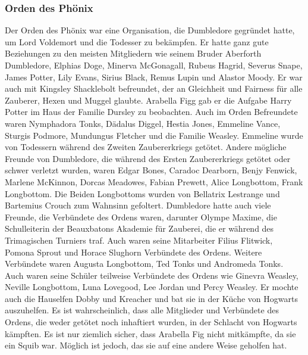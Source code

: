 \documentclass[a4paper, 10pt]{article}
\begin{document}
\subsubsection*{\large Orden des Phönix}
Der Orden des Phönix war eine Organisation, die Dumbledore gegründet hatte, um Lord Voldemort und die Todesser zu bekämpfen. Er hatte ganz gute Beziehungen zu den meisten Mitgliedern wie seinem Bruder Aberforth Dumbledore, Elphias Doge, Minerva McGonagall, Rubeus Hagrid, Severus Snape, James Potter, Lily Evans, Sirius Black, Remus Lupin und Alastor Moody.
\vspace{10pt}
\newline
Er war auch mit Kingsley Shacklebolt befreundet, der an Gleichheit und Fairness für alle Zauberer, Hexen und Muggel glaubte. Arabella Figg gab er die Aufgabe Harry Potter im Haus der Familie Dursley zu beobachten. Auch im Orden Befreundete waren Nymphadora Tonks, Dädalus Diggel, Hestia Jones, Emmeline Vance, Sturgis Podmore, Mundungus Fletcher und die Familie Weasley. Emmeline wurde von Todessern während des Zweiten Zaubererkriegs getötet.
\vspace{10pt}
\newline
Andere mögliche Freunde von Dumbledore, die während des Ersten Zaubererkriegs getötet oder schwer verletzt wurden, waren Edgar Bones, Caradoc Dearborn, Benjy Fenwick, Marlene McKinnon, Dorcas Meadowes, Fabian Prewett, Alice Longbottom, Frank Longbottom. Die Beiden Longbottoms wurden von Bellatrix Lestrange und Bartemius Crouch zum Wahnsinn gefoltert.
\vspace{10pt}
\newline
Dumbledore hatte auch viele Freunde, die Verbündete des Ordens waren, darunter Olympe Maxime, die Schulleiterin der Beauxbatons Akademie für Zauberei, die er während des Trimagischen Turniers traf. Auch waren seine Mitarbeiter Filius Flitwick, Pomona Sprout und Horace Slughorn Verbündete des Ordens. Weitere Verbündete waren Augusta Longbottom, Ted Tonks und Andromeda Tonks. Auch waren seine Schüler teilweise Verbündete des Ordens wie Ginevra Weasley, Neville Longbottom, Luna Lovegood, Lee Jordan und Percy Weasley. Er mochte auch die Hauselfen Dobby und Kreacher und bat sie in der Küche von Hogwarts auszuhelfen.
\vspace{10pt}
\newline
Es ist wahrscheinlich, dass alle Mitglieder und Verbündete des Ordens, die weder getötet noch inhaftiert wurden, in der Schlacht von Hogwarts kämpften. Es ist nur ziemlich sicher, dass Arabella Fig nicht mitkämpfte, da sie ein Squib war. Möglich ist jedoch, das sie auf eine andere Weise geholfen hat.
\end{document}
